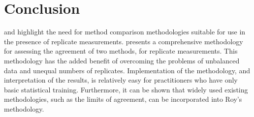 \documentclass[12pt, a4paper]{article}
\theoremstyle{plain}
\theoremstyle{definition}
\theoremstyle{remark}
\begin{document}
\section{Conclusion}
\citet{BXC2008} and \citet{roy} highlight the need for method comparison methodologies suitable for use in the presence of replicate measurements. \citet{roy} presents a comprehensive methodology for assessing the agreement of two methods, for replicate measurements. This methodology has the added benefit of overcoming the problems of unbalanced data and unequal numbers of replicates. Implementation of the methodology, and interpretation of the results, is relatively easy for practitioners who have only basic statistical training. Furthermore, it can be shown that widely used existing methodologies, such as the limits of agreement, can be incorporated into Roy's methodology.


\end{document}
